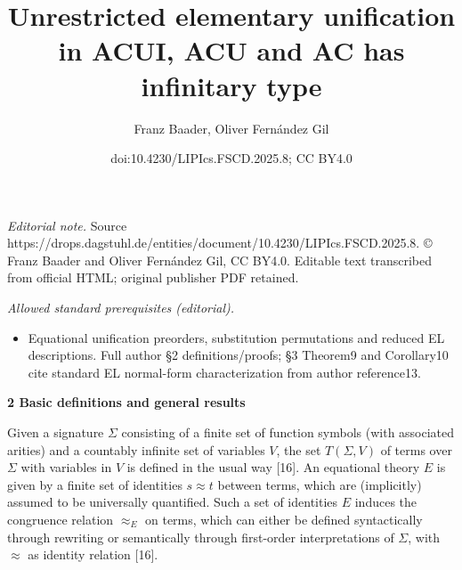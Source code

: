 \documentclass[10pt,a4paper]{amsart}
\title{Unrestricted elementary unification in ACUI, ACU and AC has infinitary type}
\author{Franz Baader, Oliver Fernández Gil}
\date{doi:10.4230/LIPIcs.FSCD.2025.8; CC BY4.0}
\begin{document}
\maketitle
\noindent\textit{Editorial note.} Source https://drops.dagstuhl.de/entities/document/10.4230/LIPIcs.FSCD.2025.8. © Franz Baader and Oliver Fernández Gil, CC BY4.0. Editable text transcribed from official HTML; original publisher PDF retained.\par\medskip
\noindent\textit{Allowed standard prerequisites (editorial).}\begin{itemize}
\item Equational unification preorders, substitution permutations and reduced EL descriptions. Full author §2 definitions/proofs; §3 Theorem9 and Corollary10 cite standard EL normal-form characterization from author reference13.
\end{itemize}\medskip
 
\par\medskip\noindent\textbf{2 Basic definitions and general results}\par
 
 
Given a signature $\Sigma$ consisting of a finite set of function symbols (with associated arities) and a countably infinite set of variables $V$, the set $T(\Sigma,V)$ of terms over $\Sigma$ with variables in $V$ is defined in the usual way [16]. An equational theory $E$ is given by a finite set of identities $s\approx t$ between terms, which are (implicitly) assumed to be universally quantified. Such a set of identities $E$ induces the congruence relation $\approx_{E}$ on terms, which can either be defined syntactically through rewriting or semantically through first-order interpretations of $\Sigma$, with $\approx$ as identity relation [16].\par
 
 
 
\end{document}
